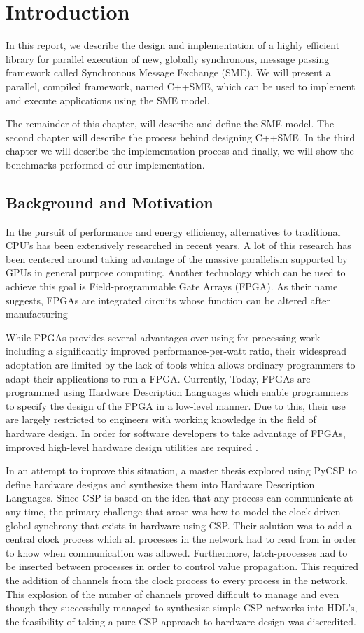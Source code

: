 \chapter{Introduction}

In this report, we describe the design and implementation of a highly
efficient library for parallel execution of new, globally synchronous,
message passing framework called Synchronous Message Exchange
(SME). We will present a parallel, compiled framework, named
C++SME, which can be used to implement and execute applications
using the SME model.

The remainder of this chapter, will describe and define the SME
model. The second chapter will describe the process behind designing
C++SME. In the third chapter we will describe the implementation
process and finally, we will show the benchmarks performed of our
implementation.


\section{Background and Motivation}
In the pursuit of performance and energy efficiency, alternatives to
traditional CPU's has been extensively researched in recent years. A
lot of this research has been centered around taking advantage of the
massive parallelism supported by GPUs in general purpose
computing. Another technology which can be used to achieve this goal
is Field-programmable Gate Arrays (FPGA). As their name suggests,
FPGAs are integrated circuits whose function can be altered after
manufacturing

While FPGAs provides several advantages over using for processing work
including a significantly improved performance-per-watt ratio, their
widespread adoptation are limited by the lack
of tools which allows ordinary programmers to adapt their applications
to run a FPGA. Currently, Today, FPGAs are programmed using Hardware
Description Languages which enable programmers to specify the design
of the FPGA in a low-level manner. Due to this, their use are largely
restricted to engineers with working knowledge in the field of
hardware design. In order for software developers to take advantage of
FPGAs, improved high-level hardware design utilities are required
\cite{bacon2013fpga}.

In an attempt to improve this situation, a master thesis explored
using PyCSP to define hardware designs and synthesize them into
Hardware Description Languages. Since CSP is based on the idea that
any process can communicate at any time, the primary challenge that
arose was how to model the clock-driven global synchrony that exists
in hardware using CSP. Their solution was to add a central
clock process which all processes in the network had to read from in
order to know when communication was allowed. Furthermore,
latch-processes had to be inserted between processes in order to
control value propagation. This required the addition of channels from
the clock process to every process in the network. This explosion of
the number of channels proved difficult to manage and even though they
successfully managed to synthesize simple CSP networks into HDL's, the
feasibility of taking a pure CSP approach to hardware design was
discredited.

